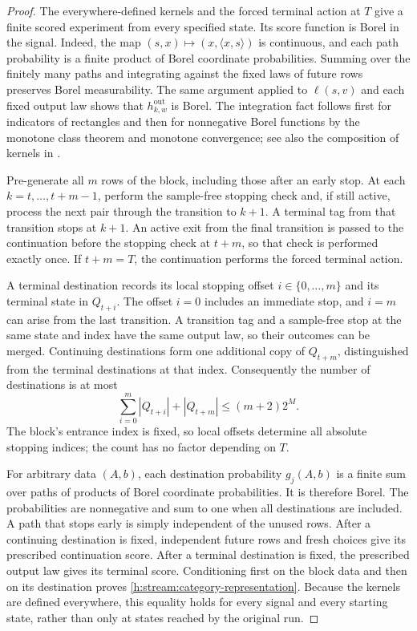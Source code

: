 \begin{proof}
The everywhere-defined kernels and the forced terminal action at $T$
give a finite scored experiment from every specified state. Its score
function is Borel in the signal. Indeed, the map
$(s,x)\mapsto(x,\langle x,s\rangle)$ is continuous, and each path
probability is a finite product of Borel coordinate probabilities.
Summing over the finitely many paths and integrating against the fixed
laws of future rows preserves Borel measurability. The same argument
applied to $\ell(s,v)$ and each fixed output law shows that
$h^{\mathrm{out}}_{k,w}$ is Borel. The integration fact follows first
for indicators of rectangles and then for nonnegative Borel functions
by the monotone class theorem and monotone convergence; see also the
composition of kernels in \cite[Section~2.3]{GagnePanangaden2023}.

Pre-generate all $m$ rows of the block, including those after an early
stop. At each $k=t,\ldots,t+m-1$, perform the sample-free stopping
check and, if still active, process the next pair through the transition
to $k+1$. A terminal tag from that transition stops at $k+1$.
An active exit from the final transition is passed to the continuation
before the stopping check at $t+m$, so that check is performed exactly
once. If $t+m=T$, the continuation performs the forced terminal action.

A terminal destination records its local stopping offset
$i\in\{0,\ldots,m\}$ and its terminal state in $Q_{t+i}$.
The offset $i=0$ includes an immediate stop, and $i=m$ can arise
from the last transition. A transition tag and a sample-free stop at
the same state and index have the same output law, so their outcomes
can be merged. Continuing destinations form one additional copy of
$Q_{t+m}$, distinguished from the terminal destinations at that index.
Consequently the number of destinations is at most
\[
 \sum_{i=0}^m|Q_{t+i}|+|Q_{t+m}|\le(m+2)2^M.
\]
The block's entrance index is fixed, so local offsets determine all
absolute stopping indices; the count has no factor depending on $T$.

For arbitrary data $(A,b)$, each destination probability $g_j(A,b)$
is a finite sum over paths of products of Borel coordinate
probabilities. It is therefore Borel. The probabilities are
nonnegative and sum to one when all destinations are included.
A path that stops early is simply independent of the unused rows.
After a continuing destination is fixed, independent future rows and
fresh choices give its prescribed continuation score. After a terminal
destination is fixed, the prescribed output law gives its terminal
score. Conditioning first on the block data and then on its destination
proves \eqref{h:stream:category-representation}. Because the kernels
are defined everywhere, this equality holds for every signal and every
starting state, rather than only at states reached by the original run.
\end{proof}

